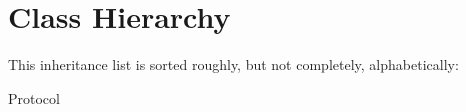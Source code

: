\section{Class Hierarchy}
This inheritance list is sorted roughly, but not completely, alphabetically\+:\begin{DoxyCompactList}
\item {}
\item Protocol\begin{DoxyCompactList}
\item {}
\item {}
\end{DoxyCompactList}
\end{DoxyCompactList}
